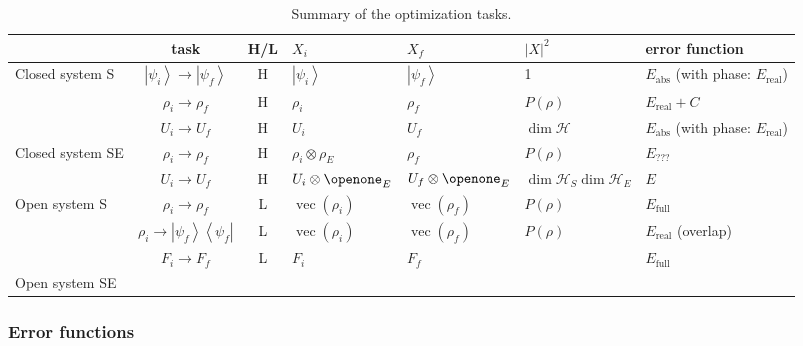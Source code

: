 \documentclass[aps, pra, a4paper, longbibliography]{revtex4}
\newcommand{\I}{\openone}
\newcommand{\ket}[1]{\left| #1 \right \rangle}
\newcommand{\ketbra}[2]{\left| #1 \right \rangle \left \langle #2 \right|}
\newcommand{\hilb}[1]{\mathcal{#1}}
\DeclareMathOperator{\cvec}{vec}
\begin{document}
\begin{table}
\begin{tabular}{l|c|c|l|l|l|l}
& task & H/L & $X_i$ & $X_f$ & $|X|^2$ & error function\\
\hline
Closed system S
& $\ket{\psi_i} \to \ket{\psi_f}$ & H
& $\ket{\psi_i}$ & $\ket{\psi_f}$ & 1 & $E_\text{abs}$ (with phase: $E_\text{real}$)\\
& $\rho_i \to \rho_f$ & H
& $\rho_i$ & $\rho_f$ & $P(\rho)$ & $E_\text{real} + C$\\
& $U_i \to U_f$ & H
& $U_i$ & $U_f$ & $\dim \hilb{H}$ & $E_\text{abs}$ (with phase: $E_\text{real}$)\\
\hline
Closed system SE
& $\rho_i \to \rho_f$ & H
& $\rho_i \otimes \rho_E$ & $\rho_f$ & $P(\rho)$ & $E_\text{???}$\\
& $U_i \to U_f$ & H
& $U_i \otimes \I_E$ & $U_f \otimes \I_E$ & $\dim \hilb{H}_S \dim \hilb{H}_E$ & $E_\text{}$\\
\hline
Open system S
& $\rho_i \to \rho_f$ & L & $\cvec(\rho_i)$ & $\cvec(\rho_f)$ & $P(\rho)$ & $E_\text{full}$\\
& $\rho_i \to \ketbra{\psi_f}{\psi_f}$ & L
& $\cvec(\rho_i)$ & $\cvec(\rho_f)$ & $P(\rho)$ & $E_\text{real}$ (overlap)\\
& $F_i \to F_f$ & L & $F_i$ & $F_f$ & & $E_\text{full}$\\
\hline
Open system SE
\end{tabular}
\caption{Summary of the optimization tasks.}
\label{table:tasks}
\end{table}


\subsubsection*{Error functions}
\end{document}
